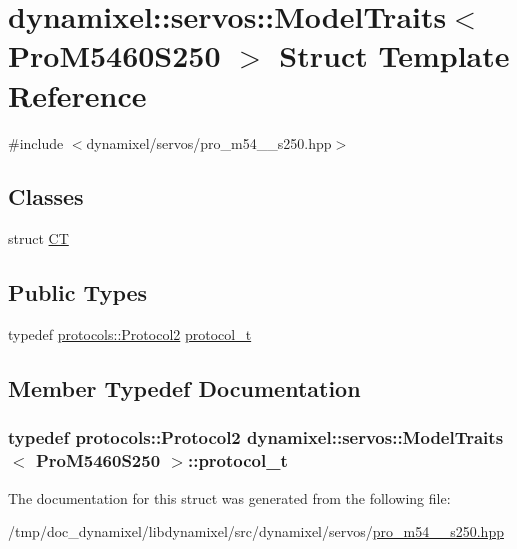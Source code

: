 \hypertarget{structdynamixel_1_1servos_1_1_model_traits_3_01_pro_m5460_s250_01_4}{}\section{dynamixel\+:\+:servos\+:\+:Model\+Traits$<$ Pro\+M5460\+S250 $>$ Struct Template Reference}
\label{structdynamixel_1_1servos_1_1_model_traits_3_01_pro_m5460_s250_01_4}


{\ttfamily \#include $<$dynamixel/servos/pro\+\_\+m54\+\_\+\_\+s250.\+hpp$>$}

\subsection*{Classes}
\begin{DoxyCompactItemize}
\item 
struct \hyperlink{structdynamixel_1_1servos_1_1_model_traits_3_01_pro_m5460_s250_01_4_1_1_c_t}{CT}
\end{DoxyCompactItemize}
\subsection*{Public Types}
\begin{DoxyCompactItemize}
\item 
typedef \hyperlink{classdynamixel_1_1protocols_1_1_protocol2}{protocols\+::\+Protocol2} \hyperlink{structdynamixel_1_1servos_1_1_model_traits_3_01_pro_m5460_s250_01_4_a6f40001a9ef73dd09907f4af6dc74783}{protocol\+\_\+t}
\end{DoxyCompactItemize}


\subsection{Member Typedef Documentation}
\subsubsection[{\texorpdfstring{protocol\+\_\+t}{protocol_t}}]{\setlength{\rightskip}{0pt plus 5cm}typedef {\bf protocols\+::\+Protocol2} {\bf dynamixel\+::servos\+::\+Model\+Traits}$<$ {\bf Pro\+M5460\+S250} $>$\+::{\bf protocol\+\_\+t}}\hypertarget{structdynamixel_1_1servos_1_1_model_traits_3_01_pro_m5460_s250_01_4_a6f40001a9ef73dd09907f4af6dc74783}{}\label{structdynamixel_1_1servos_1_1_model_traits_3_01_pro_m5460_s250_01_4_a6f40001a9ef73dd09907f4af6dc74783}


The documentation for this struct was generated from the following file\+:\begin{DoxyCompactItemize}
\item 
/tmp/doc\+\_\+dynamixel/libdynamixel/src/dynamixel/servos/\hyperlink{pro__m54__60__s250_8hpp}{pro\+\_\+m54\+\_\+\_\+s250.\+hpp}\end{DoxyCompactItemize}
